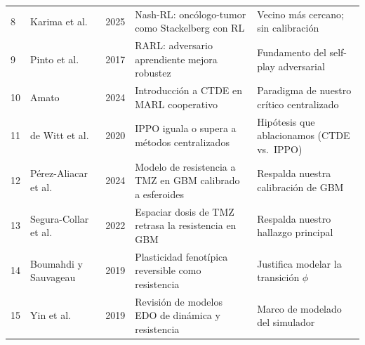 {\begin{longtable}{@{}p{0.4cm}p{2.7cm}p{0.7cm}p{3.3cm}p{3.9cm}@{}}
8 & Karima et al.~\cite{Karima2025} & 2025 & Nash-RL: oncólogo-tumor como Stackelberg con RL & Vecino más cercano; sin calibración \\
9 & Pinto et al.~\cite{Pinto2017} & 2017 & RARL: adversario aprendiente mejora robustez & Fundamento del self-play adversarial \\
10 & Amato~\cite{Amato2024} & 2024 & Introducción a CTDE en MARL cooperativo & Paradigma de nuestro crítico centralizado \\
11 & de Witt et al.~\cite{deWitt2020} & 2020 & IPPO iguala o supera a métodos centralizados & Hipótesis que ablacionamos (CTDE vs.\ IPPO) \\
12 & Pérez-Aliacar et al.~\cite{PerezAliacar2024} & 2024 & Modelo de resistencia a TMZ en GBM calibrado a esferoides & Respalda nuestra calibración de GBM \\
13 & Segura-Collar et al.~\cite{SeguraCollar2022} & 2022 & Espaciar dosis de TMZ retrasa la resistencia en GBM & Respalda nuestro hallazgo principal \\
14 & Boumahdi y Sauvageau~\cite{Boumahdi2019} & 2019 & Plasticidad fenotípica reversible como resistencia & Justifica modelar la transición $\phi$ \\
15 & Yin et al.~\cite{Yin2019} & 2019 & Revisión de modelos EDO de dinámica y resistencia & Marco de modelado del simulador \\
\hline
\end{longtable}
}
